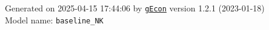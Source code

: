 \documentclass[10pt,a4paper]{article}
\numberwithin{equation}{section}
\begin{document}
\begin{landscape}
\begin{flushleft}{\large
Generated  on 2025-04-15 17:44:06 by \href{http://gecon.r-forge.r-project.org/}{\texttt{gEcon}} version 1.2.1 (2023-01-18)\\
Model name: \verb+baseline_NK+
}\end{flushleft}


\end{landscape}

\end{document}
